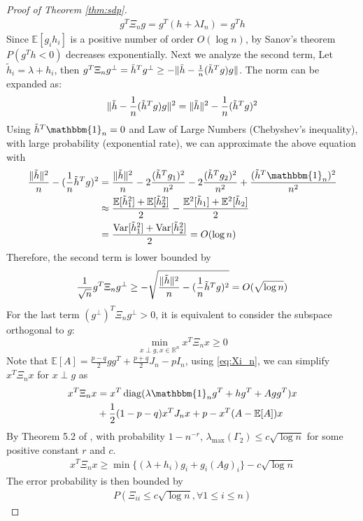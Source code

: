 \documentclass[conference]{IEEEtran}
\DeclarePairedDelimiter\norm{\lVert}{\rVert}
\DeclareMathOperator{\Var}{Var}
\DeclareMathOperator{\diag}{diag}
\begin{document}
\begin{proof}[Proof of Theorem \ref{thm:sdp}]
\begin{align*}
g^T \Xi_n g = g^T(h+\lambda I_n) = g^T h
\end{align*}
Since $\mathbb{E}[g_ih_i]$ is a positive number of order $O(\log n)$, by Sanov's theorem
$P(g^T h < 0)$ decreases exponentially. Next we analyze the second term, Let $\tilde{h}_i
=\lambda+h_i$, then
$g^T \Xi_n g^{\perp} = \tilde{h}^T g^{\perp} \geq -\norm{\tilde{h}-\frac{1}{n}(\tilde{h}^Tg)g}$.
The norm can be expanded as:
\begin{align*}
\norm{\tilde{h}-\frac{1}{n}(\tilde{h}^Tg)g}^2
=\norm{\tilde{h}}^2 - \frac{1}{n}(\tilde{h}^Tg)^2
\end{align*}
Using $\tilde{h}^T\mathbbm{1}_n=0$ and Law of Large Numbers (Chebyshev's inequality), with large probability (exponential rate), we can approximate
the above equation with 
\begin{align*}
\frac{\norm{\tilde{h}}^2}{n} - (\frac{1}{n}\tilde{h}^Tg)^2
&=\frac{\norm{\tilde{h}}^2}{n} - 2\frac{(\tilde{h}^T g_1)^2}{n^2} - 2\frac{(\tilde{h}^T g_2)^2}{n^2} + \frac{(\tilde{h}^T\mathbbm{1}_n)^2}{n^2} \\
&\approx \frac{\mathbb{E}[\tilde{h}_1^2]+\mathbb{E}[\tilde{h}_2^2]}{2}
-\frac{\mathbb{E}^2[\tilde{h}_1]+\mathbb{E}^2[\tilde{h}_2]}{2}\\
&= \frac{\Var[\tilde{h}_1^2]+\Var[\tilde{h}_2^2]}{2}
 = O(\log n)
\end{align*}		
Therefore, the second term is lower bounded by
$$
\frac{1}{\sqrt{n}} g^T \Xi_n g^{\perp} \geq -\sqrt{\frac{\norm{\tilde{h}}^2}{n} - (\frac{1}{n}\tilde{h}^Tg)^2} = O(\sqrt{\log n})
$$
For the last term $(g^{\perp})^T \Xi_n g^{\perp} >0$, it is equivalent
to consider the subspace orthogonal to $g$:
$$
\min_{x \perp g, x \in \mathbb{R}^n } x^T \Xi_n x \geq 0
$$
Note that $\mathbb{E}[A] = \frac{p-q}{2}gg^T + \frac{p+q}{2}J_n - pI_n$,
using \eqref{eq:Xi_n}, we can simplify $x^T \Xi_n x$ for $x \perp g$ as
\begin{align*}
x^T \Xi_n x &= x^T \diag( \lambda \mathbbm{1}_ng^T+hg^T + Agg^T) x  \\
&+ \frac{1}{2}(1-p-q)x^TJ_n x
+ p -x^T(A-\mathbb{E}[A])x
\end{align*}
By Theorem 5.2 of \cite{lei2015consistency},
with probability $1-n^{-r}$, $\lambda_{\max}(\Gamma_2) \leq c\sqrt{\log n}$ for some positive constant $r$ and $c$.
\begin{align*}
x^T \Xi_n x \geq \min\{(\lambda + h_i) g_i + g_i (Ag)_i \} - c \sqrt{\log n}
\end{align*}
The error probability is then bounded by
\begin{align*}
P(\Xi_{ii} \leq c\sqrt{\log n}, \forall 1\leq i \leq n)
\end{align*}


\end{proof}
\end{document}
